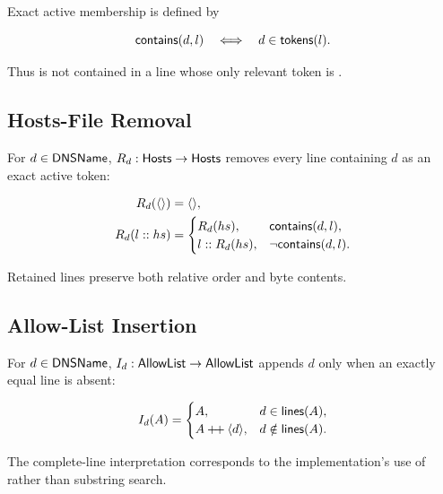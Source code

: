 Exact active membership is defined by

\[
  \mathsf{contains}(d,l) \quad\Longleftrightarrow\quad d\in\mathsf{tokens}(l).
\]

Thus  is not contained in a line whose only relevant
token is .

\subsection{Hosts-File Removal}

For $d\in\mathsf{DNSName}$, $R_{d}:\mathsf{Hosts}\rightarrow\mathsf{Hosts}$ removes every line
containing $d$ as an exact active token:

\begin{align*}
R_{d}(\langle\rangle) &= \langle\rangle,\\
R_{d}(l::hs) &=
  \begin{cases}
    R_{d}(hs), & \mathsf{contains}(d,l),\\
    l::R_{d}(hs), & \neg\mathsf{contains}(d,l).
  \end{cases}
\end{align*}

Retained lines preserve both relative order and byte contents.

\subsection{Allow-List Insertion}

For $d\in\mathsf{DNSName}$, $I_{d}:\mathsf{AllowList}\rightarrow\mathsf{AllowList}$ appends $d$
only when an exactly equal line is absent:

\[
I_{d}(A)=
  \begin{cases}
    A, & d\in\mathsf{lines}(A),\\
    A\mathbin{+\!+}\langle d\rangle, & d\notin\mathsf{lines}(A).
  \end{cases}
\]

The complete-line interpretation corresponds to the implementation's use of
 rather than substring search.
